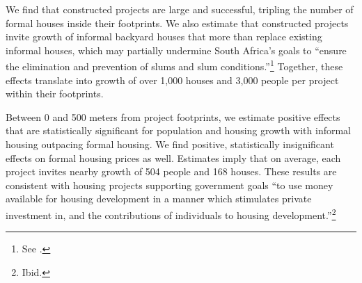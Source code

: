 \documentclass[12pt]{article}
\begin{document}
We find that constructed projects are large and successful, tripling the number of formal houses inside their footprints.  We also estimate that constructed projects invite growth of informal backyard houses that more than replace existing informal houses, which may partially undermine South Africa's goals to ``ensure the elimination and prevention of slums and slum conditions.''\footnote{See \cite{housingact}.}  Together, these effects translate into growth of over 1,000 houses and 3,000 people per project within their footprints.










Between 0 and 500 meters from project footprints, we estimate positive effects that are statistically significant for population and housing growth with informal housing outpacing formal housing.   We find positive, statistically insignificant effects on formal housing prices as well.  Estimates imply that on average, each project invites nearby growth of 504 people and 168 houses.  These results are consistent with housing projects supporting government goals ``to use money available for housing development in a manner which stimulates private investment in, and the contributions of individuals to housing development.''\footnote{Ibid.} 
\end{document}

